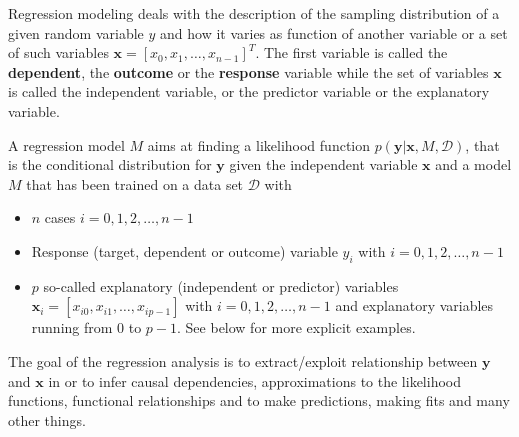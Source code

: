 \documentclass[%
oneside,                 %
final,                   %
10pt]{article}
\newenvironment{block_mdfboxadmon}[1][]{
\begin{block_mdfboxmdframed}[frametitle=#1]
}
{
\end{block_mdfboxmdframed}
}
\begin{document}
\begin{block_mdfboxadmon}[]

Regression modeling deals with the description of  the sampling distribution of a given random variable $y$ and how it varies as function of another variable or a set of such variables $\bm{x} =[x_0, x_1,\dots, x_{n-1}]^T$. 
The first variable is called the \textbf{dependent}, the \textbf{outcome} or the \textbf{response} variable while the set of variables $\bm{x}$ is called the independent variable, or the predictor variable or the explanatory variable. 

A regression model $M$ aims at finding a likelihood function $p(\bm{y}\vert \bm{x},M,\mathcal{D})$, that is the conditional distribution for $\bm{y}$ given the independent variable $\bm{x}$ and a model $M$ that has been trained on a data set $\mathcal{D}$ with 
\begin{itemize}
\item $n$ cases $i = 0, 1, 2, \dots, n-1$ 

\item Response (target, dependent or outcome) variable $y_i$ with $i = 0, 1, 2, \dots, n-1$ 

\item $p$ so-called explanatory (independent or predictor) variables $\bm{x}_i=[x_{i0}, x_{i1}, \dots, x_{ip-1}]$ with $i = 0, 1, 2, \dots, n-1$ and explanatory variables running from $0$ to $p-1$. See below for more explicit examples.   
\end{itemize}

\noindent
 The goal of the regression analysis is to extract/exploit relationship between $\bm{y}$ and $\bm{x}$ in or to infer causal dependencies, approximations to the likelihood functions, functional relationships and to make predictions, making fits and many other things.
\end{block_mdfboxadmon} %



\end{document}
